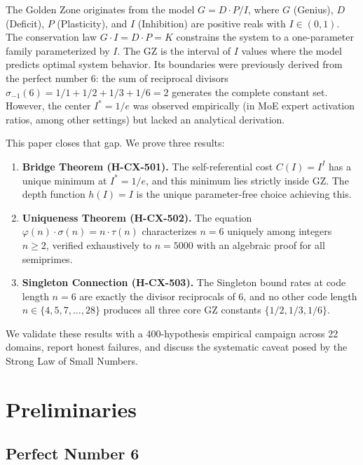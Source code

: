 \documentclass[11pt,a4paper]{article}
\begin{document}
The Golden Zone originates from the model $G = D \cdot P / I$, where $G$ (Genius), $D$ (Deficit), $P$ (Plasticity), and $I$ (Inhibition) are positive reals with $I \in (0, 1)$. The conservation law $G \cdot I = D \cdot P = K$ constrains the system to a one-parameter family parameterized by $I$. The GZ is the interval of $I$ values where the model predicts optimal system behavior. Its boundaries were previously derived from the perfect number 6: the sum of reciprocal divisors $\sigma_{-1}(6) = 1/1 + 1/2 + 1/3 + 1/6 = 2$ generates the complete constant set. However, the center $I^* = 1/e$ was observed empirically (in MoE expert activation ratios, among other settings) but lacked an analytical derivation.

This paper closes that gap. We prove three results:

\begin{enumerate}
  \item \textbf{Bridge Theorem (H-CX-501).} The self-referential cost $C(I) = I^I$ has a unique minimum at $I^* = 1/e$, and this minimum lies strictly inside GZ. The depth function $h(I) = I$ is the unique parameter-free choice achieving this.

  \item \textbf{Uniqueness Theorem (H-CX-502).} The equation $\varphi(n) \cdot \sigma(n) = n \cdot \tau(n)$ characterizes $n = 6$ uniquely among integers $n \geq 2$, verified exhaustively to $n = 5000$ with an algebraic proof for all semiprimes.

  \item \textbf{Singleton Connection (H-CX-503).} The Singleton bound rates at code length $n = 6$ are exactly the divisor reciprocals of 6, and no other code length $n \in \{4, 5, 7, \ldots, 28\}$ produces all three core GZ constants $\{1/2, 1/3, 1/6\}$.
\end{enumerate}

We validate these results with a 400-hypothesis empirical campaign across 22 domains, report honest failures, and discuss the systematic caveat posed by the Strong Law of Small Numbers.

\section{Preliminaries}

\subsection{Perfect Number 6}
\end{document}
